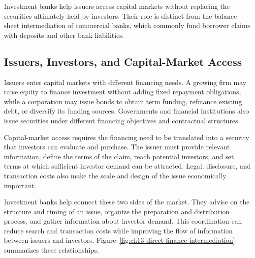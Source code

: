 Investment banks help issuers access capital markets without replacing the securities ultimately held by investors. Their role is distinct from the balance-sheet intermediation of commercial banks, which commonly fund borrower claims with deposits and other bank liabilities.

\subsection{Issuers, Investors, and Capital-Market Access}

Issuers enter capital markets with different financing needs. A growing firm may raise equity to finance investment without adding fixed repayment obligations, while a corporation may issue bonds to obtain term funding, refinance existing debt, or diversify its funding sources. Governments and financial institutions also issue securities under different financing objectives and contractual structures.

Capital-market access requires the financing need to be translated into a security that investors can evaluate and purchase. The issuer must provide relevant information, define the terms of the claim, reach potential investors, and set terms at which sufficient investor demand can be attracted. Legal, disclosure, and transaction costs also make the scale and design of the issue economically important.

Investment banks help connect these two sides of the market. They advise on the structure and timing of an issue, organize the preparation and distribution process, and gather information about investor demand. This coordination can reduce search and transaction costs while improving the flow of information between issuers and investors. Figure~\ref{fig:ch13-direct-finance-intermediation} summarizes these relationships.

